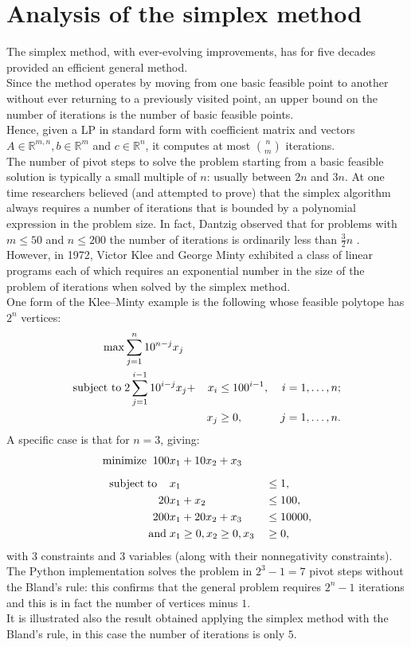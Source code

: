 \documentclass[a4paper,10 pt,titlepage,twoside]{book}
\theoremstyle{plain}
\theoremstyle{definition}
\theoremstyle{remark}
\begin{document}
 \section{Analysis of the simplex method}
The simplex method, with ever-evolving improvements, has for five decades provided an efficient general
method. \\
 Since the method operates by moving from one basic feasible point
to another without ever returning to a previously visited point, an upper bound
on the number of iterations is the number of basic feasible points.\\Hence, given a LP in standard form with
coefficient matrix and vectors $A\in\mathbb{R}^{m,n}, b\in\mathbb{R}^{m}$ and $c\in\mathbb{R}^{n}$, it computes at most $n\choose m$ iterations.\\
The number of pivot steps to solve
the problem starting from a basic feasible solution is typically a small multiple of
$n$: usually between $2n$ and $3n$. At one time researchers believed (and attempted to prove) that the simplex algorithm always requires a number of iterations that is
bounded by a polynomial expression in the problem size. In fact, Dantzig observed that for problems with
$m \leq 50$ and $n \leq 200$ the number of iterations is ordinarily less than $\frac{3}{2}n$ \cite{DAN}.
\\ However, in 1972, Victor Klee and George Minty exhibited a class of linear programs each of which requires an
exponential number in the size of the problem of iterations when solved by the simplex method.\\
One form of the Klee–Minty example is the following whose feasible polytope has $2^{n}$
vertices:
\begin{alignat*}{4}
\max &\sum_{j=1}^{n}10^{n-j}x_{j}&&&\\
\text{subject to\;}&2\sum_{j=1}^{i-1}10^{i-j}x_{j}+&x_{i}&\leq 100^{i-1}, \, &i = 1,\dots, n;\\
&&x_{j}&\geq 0, \,&j = 1,\dots, n.\\
\end{alignat*}
A specific case is that for $n = 3$, giving:
\begin{alignat*}{2}
\text{minimize\;}\; 100& x_1+10x_2+ x_3&&\\[2mm]
\text{subject\;to\;\;\;\;} &x_1&&\leq 1,\\
						20& x_1+x_2&&\leq 100,\\
200 &x_1 +20x_2 +x_{3}&&\leq 10000,\\
\text{and}\;& x_1\geq 0,x_2\geq 0,x_3&&\geq 0,
\end{alignat*}
with 3 constraints and 3 variables (along with their nonnegativity constraints).\\
The Python implementation solves the problem in $2^{3} - 1 = 7$ pivot steps without the Bland's rule: this confirms that the general problem requires $2^{n}- 1$ iterations and this is in fact
the number of vertices minus $1$.\cite{MINTY}\\ It is illustrated also the result obtained applying the simplex method with the Bland's rule, in this case the number of iterations is only $5$.  \\
\end{document}
